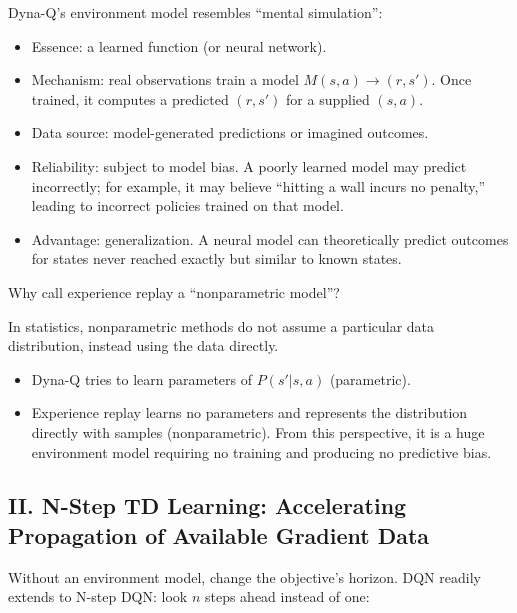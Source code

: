 Dyna-Q's environment model resembles ``mental simulation'':

\begin{itemize}
\tightlist
\item
  Essence: a learned function (or neural network).
\item
  Mechanism: real observations train a model \(M(s,a)\to(r,s')\). Once trained, it computes a predicted \((r,s')\) for a supplied \((s,a)\).
\item
  Data source: model-generated predictions or imagined outcomes.
\item
  Reliability: subject to model bias. A poorly learned model may predict incorrectly; for example, it may believe ``hitting a wall incurs no penalty,'' leading to incorrect policies trained on that model.
\item
  Advantage: generalization. A neural model can theoretically predict outcomes for states never reached exactly but similar to known states.
\end{itemize}

Why call experience replay a ``nonparametric model''?

In statistics, nonparametric methods do not assume a particular data distribution, instead using the data directly.

\begin{itemize}
\tightlist
\item
  Dyna-Q tries to learn parameters of \(P(s'|s,a)\) (parametric).
\item
  Experience replay learns no parameters and represents the distribution directly with samples (nonparametric). From this perspective, it is a huge environment model requiring no training and producing no predictive bias.
\end{itemize}

\hypertarget{ii.-n-step-td-learning-accelerating-propagation-of-available-gradient-data}{%
\subsection{II. N-Step TD Learning: Accelerating Propagation of Available Gradient Data}\label{ii.-n-step-td-learning-accelerating-propagation-of-available-gradient-data}}

Without an environment model, change the objective's horizon. DQN readily extends to N-step DQN: look \(n\) steps ahead instead of one:

